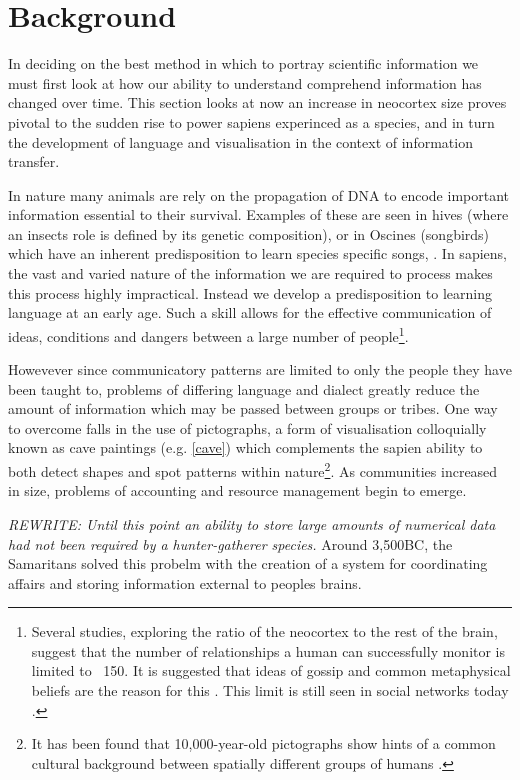 
\section*{Background}

In deciding on the best method in which to portray scientific information we must first look at how our ability to understand comprehend information has changed over time. This section looks at now an increase in neocortex size proves pivotal to the sudden rise to power sapiens experinced as a species, and in turn the development of language and visualisation in the context of information transfer. 

In nature many animals are rely on the propagation of DNA to encode important information essential to their survival. Examples of these are seen in hives (where an insects role is defined by its genetic composition), or in Oscines (songbirds) which have an inherent predisposition to learn species specific songs, \cite{modelingpythonbees,genomics,birds,birdsongs,sapiens}.
In sapiens, the vast and varied nature of the information we are required to process makes this process highly impractical. Instead we develop a predisposition to learning language at an early age. Such a skill allows for the effective communication of ideas, conditions and dangers between a large number of people\footnote{Several studies, exploring the ratio of the neocortex to the rest of the brain, suggest that the number of relationships a human can successfully monitor is limited to ~150. It is suggested that ideas of gossip and common metaphysical beliefs are the reason for this \cite{sapiens,neo,gossip}. This limit is still seen in social networks today \cite{social}.}.

Howevever since communicatory patterns are limited to only the people they have been taught to, problems of differing language and dialect greatly reduce the amount of information which may be passed between groups or tribes. One way to overcome falls in the use of pictographs, a form of visualisation colloquially known as cave paintings (e.g. \autoref{cave}) which complements the sapien ability to both detect shapes and spot patterns within nature\footnote{It has been found that 10,000-year-old pictographs show hints of a common cultural background between spatially different groups of humans \cite{cave}.}. As communities increased in size, problems of accounting and resource management begin to emerge.




 \emph{REWRITE:
 Until this point an ability to store large amounts of numerical data had not been required by a hunter-gatherer species.} Around 3,500BC, the Samaritans solved this probelm with the creation of a system for coordinating affairs and storing information external to peoples brains. 

